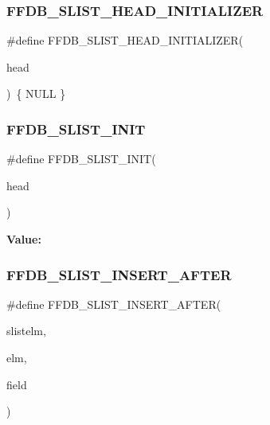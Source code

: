 \subsubsection{\texorpdfstring{FFDB\_SLIST\_HEAD\_INITIALIZER}{FFDB\_SLIST\_HEAD\_INITIALIZER}}
{\footnotesize\ttfamily \#define F\+F\+D\+B\+\_\+\+S\+L\+I\+S\+T\+\_\+\+H\+E\+A\+D\+\_\+\+I\+N\+I\+T\+I\+A\+L\+I\+Z\+ER(\begin{DoxyParamCaption}\item[{}]{head }\end{DoxyParamCaption})~\{ N\+U\+LL \}}

\mbox{\label{adat-devel_2other__libs_2filedb_2filehash_2ffdb__cq_8h_ad7f74f5b75af52a9e3dfe6a4e46338bc}} 
\subsubsection{\texorpdfstring{FFDB\_SLIST\_INIT}{FFDB\_SLIST\_INIT}}
{\footnotesize\ttfamily \#define F\+F\+D\+B\+\_\+\+S\+L\+I\+S\+T\+\_\+\+I\+N\+IT(\begin{DoxyParamCaption}\item[{}]{head }\end{DoxyParamCaption})}

{\bfseries Value\+:}
\begin{DoxyCode}{0}
\DoxyCodeLine{\textcolor{keywordflow}{do} \{                    \(\backslash\)}

\end{DoxyCode}
\mbox{\label{adat-devel_2other__libs_2filedb_2filehash_2ffdb__cq_8h_ae261c7ea4f65e01c040b2fa214b2932f}} 
\subsubsection{\texorpdfstring{FFDB\_SLIST\_INSERT\_AFTER}{FFDB\_SLIST\_INSERT\_AFTER}}
{\footnotesize\ttfamily \#define F\+F\+D\+B\+\_\+\+S\+L\+I\+S\+T\+\_\+\+I\+N\+S\+E\+R\+T\+\_\+\+A\+F\+T\+ER(\begin{DoxyParamCaption}\item[{}]{slistelm,  }\item[{}]{elm,  }\item[{}]{field }\end{DoxyParamCaption})}

